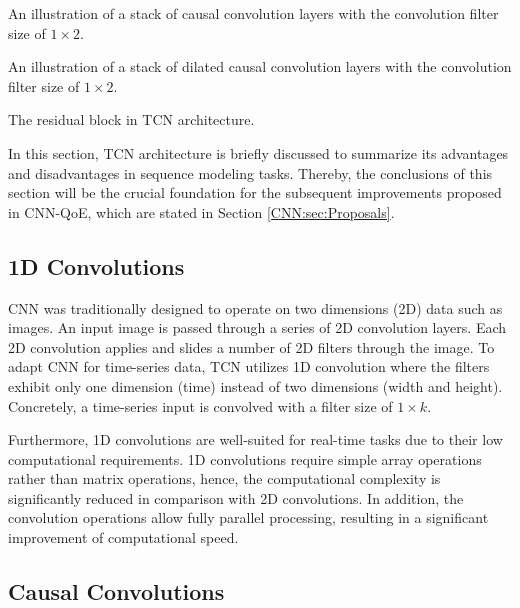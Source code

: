    {An illustration of a stack of causal convolution layers with the convolution filter size of $1 \times 2$.\label{fig:CausalConv}}

   {An illustration of a stack of dilated causal convolution layers with the convolution filter size of $1 \times 2$.\label{fig:DilatedConv}}
   
   {The residual block in TCN architecture.\label{fig:TCN_residualBlock}}

In this section, TCN architecture is briefly discussed to summarize its advantages and disadvantages in sequence modeling tasks. Thereby, the conclusions of this section will be the crucial foundation for the subsequent improvements proposed in CNN-QoE, which are stated in Section \ref{CNN:sec:Proposals}.


\subsection{1D Convolutions}

CNN was traditionally designed to operate on two dimensions (2D) data such as images.
An input image is passed through a series of 2D convolution layers.
Each 2D convolution applies and slides a number of 2D filters through the image.
To adapt CNN for time-series data, TCN utilizes 1D convolution where the filters exhibit only one dimension (time) instead of two dimensions (width and height).
Concretely, a time-series input is convolved with a filter size of $1 \times k$.

Furthermore, 1D convolutions are well-suited for real-time tasks due to their low computational requirements.
1D convolutions require simple array operations rather than matrix operations, hence, the computational complexity is significantly reduced in comparison with 2D convolutions.
In addition, the convolution operations allow fully parallel processing, resulting in a significant improvement of computational speed.



\subsection{Causal Convolutions}


